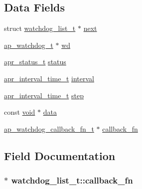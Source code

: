 \subsection*{Data Fields}
\begin{DoxyCompactItemize}
\item 
struct \hyperlink{structwatchdog__list__t}{watchdog\+\_\+list\+\_\+t} $\ast$ \hyperlink{structwatchdog__list__t_ab94c8bf2602843fab3877fdc14a9a1ac}{next}
\item 
\hyperlink{structap__watchdog__t}{ap\+\_\+watchdog\+\_\+t} $\ast$ \hyperlink{structwatchdog__list__t_a15af0660656a49ca76bc5113fe3b5162}{wd}
\item 
\hyperlink{group__apr__errno_gaa5105fa83cc322f09382292db8b47593}{apr\+\_\+status\+\_\+t} \hyperlink{structwatchdog__list__t_adc4b2dce631cff5625822d2e833b2033}{status}
\item 
\hyperlink{group__apr__time_gaae2129185a395cc393f76fabf4f43e47}{apr\+\_\+interval\+\_\+time\+\_\+t} \hyperlink{structwatchdog__list__t_a8af3fff656a023e855ee32e71c50d2c7}{interval}
\item 
\hyperlink{group__apr__time_gaae2129185a395cc393f76fabf4f43e47}{apr\+\_\+interval\+\_\+time\+\_\+t} \hyperlink{structwatchdog__list__t_a3453ced7639ef34a48b57de8ced2d526}{step}
\item 
const \hyperlink{group__MOD__ISAPI_gacd6cdbf73df3d9eed42fa493d9b621a6}{void} $\ast$ \hyperlink{structwatchdog__list__t_a97f74b01605b76fe470082c9b7af86d9}{data}
\item 
\hyperlink{group__MOD__WATCHDOG_gaf35a15ca6cadfcd5df128e79cb51c115}{ap\+\_\+watchdog\+\_\+callback\+\_\+fn\+\_\+t} $\ast$ \hyperlink{structwatchdog__list__t_a6bbbb0d5655922801847c636ddbcd103}{callback\+\_\+fn}
\end{DoxyCompactItemize}


\subsection{Field Documentation}
\subsubsection[{\texorpdfstring{callback\+\_\+fn}{callback_fn}}]{$\ast$ watchdog\+\_\+list\+\_\+t\+::callback\+\_\+fn}\hypertarget{structwatchdog__list__t_a6bbbb0d5655922801847c636ddbcd103}{}\label{structwatchdog__list__t_a6bbbb0d5655922801847c636ddbcd103}
